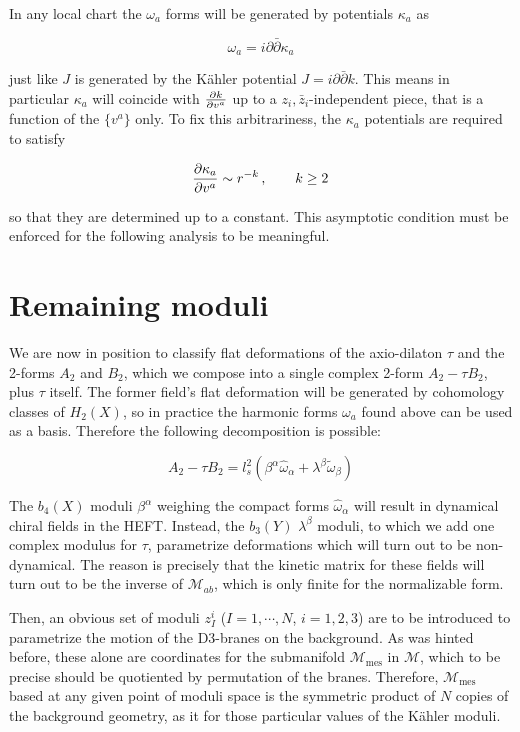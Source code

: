 In any local chart the $\omega_a$ forms will be generated by potentials $\kappa_a$ as 

\begin{equation}
	\omega_a = i \partial \bar \partial \kappa_a 
	\label{}
\end{equation}

just like $J$ is generated by the K\"ahler potential $J = i \partial \bar \partial k$. This means in particular $\kappa_a$ will coincide with $\frac{\partial k}{\partial v^a}$ up to a $z_i, \bar z_i$-independent piece, that is a function of the $\{v^a\}$ only. To fix this arbitrariness, the $\kappa_a$ potentials are required to satisfy

\begin{equation}
	\frac{\partial\kappa_a}{\partial v^a} \sim r^{-k}\,, \quad \quad k \geq 2
	\label{asycond}
\end{equation}

so that they are determined up to a constant. This asymptotic condition must be enforced for the following analysis to be meaningful.

\section{Remaining moduli}\label{sec:hefttwo}

We are now in position to classify flat deformations of the axio-dilaton $\tau$ and the 2-forms $A_2$ and $B_2$, which we compose into a single complex 2-form $A_2 - \tau B_2$, plus $\tau$ itself. The former field's flat deformation will be generated by cohomology classes of $H_2(X)$, so in practice the harmonic forms $\omega_a$ found above can be used as a basis. Therefore the following decomposition is possible:

\begin{equation}
	A_2 - \tau B_2 = l_s^2 \left( \beta^\alpha \hat\omega_\alpha + \lambda^\beta \tilde \omega_\beta \right)
	\label{ABvariation}
\end{equation}

The $b_4(X)$ moduli $\beta^\alpha$ weighing the compact forms $\hat\omega_\alpha$ will result in dynamical chiral fields in the HEFT. Instead, the $b_3(Y)$ $\lambda^\beta$ moduli, to which we add one complex modulus for $\tau$, parametrize deformations which will turn out to be non-dynamical. The reason is precisely that the kinetic matrix for these fields will turn out to be the inverse of $\mathcal{M}_{ab}$, which is only finite for the normalizable form.

Then, an obvious set of moduli $z_I^i$ ($I=1,\cdots,N$, $i = 1,2,3$) are to be introduced to parametrize the motion of the D3-branes on the background. As was hinted before, these alone are coordinates for the submanifold $\mathcal{M}_\text{mes}$ in $\mathcal{M}$, which to be precise should be quotiented by permutation of the branes. Therefore, $\mathcal{M}_\text{mes}$ based at any given point of moduli space is the symmetric product of $N$ copies of the background geometry, as it for those particular values of the K\"ahler moduli.


